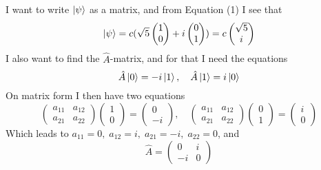 \documentclass{scrartcl}
\begin{document}
I want to write $\ket{\psi}$ as a matrix, and from Equation (1) I see that
\begin{equation}
\ket{\psi}=c(\sqrt{5}\begin{pmatrix}1\\0\end{pmatrix}+i\begin{pmatrix}0\\1\end{pmatrix})
=c\begin{pmatrix}\sqrt{5}\\i\end{pmatrix}
\end{equation}
I also want to find the $\hat{A}$-matrix, and for that I need the equations
$$\hat{A}\ket{0}=-i\ket{1},\quad\hat{A}\ket{1}=i\ket{0}$$
On matrix form I then have two equations
$$\begin{pmatrix}a_{11}&a_{12}\\a_{21}&a_{22}\end{pmatrix}\begin{pmatrix}1\\0\end{pmatrix}
=\begin{pmatrix}0\\-i\end{pmatrix},\quad\begin{pmatrix}a_{11}&a_{12}\\a_{21}&a_{22}\end{pmatrix}\begin{pmatrix}0\\1\end{pmatrix}
=\begin{pmatrix}i\\0\end{pmatrix}$$
Which leads to $a_{11}=0,\;a_{12}=i,\;a_{21}=-i,\;a_{22}=0$, and
\begin{equation}
\hat{A}=\begin{pmatrix}0&i\\-i&0\end{pmatrix}
\end{equation}
\end{document}
